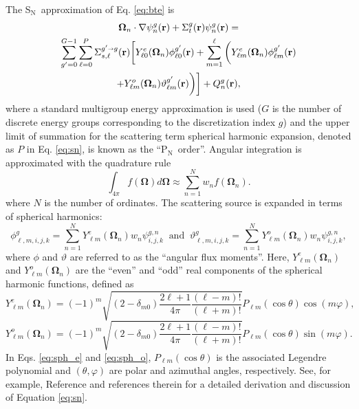 \documentclass{article} %
\newcommand{\sa}{\shortrightarrow}
\newcommand{\bo}{\mathbf\Omega}
\newcommand{\vecr}{\textbf{r}}
\newcommand{\sn}{S$_\mathrm{N}$}
\newcommand{\pn}{P$_\mathrm{N}$}
\newcommand{\Ye}[2]{\ensuremath{Y^e_{#1}(\bo_#2)}}
\newcommand{\Yo}[2]{\ensuremath{Y^o_{#1}(\bo_#2)}}
\begin{document}
The \sn\ approximation of Eq. \eqref{eq:bte} is
%
\begin{multline}
\bo_n \cdot \nabla \psi_n^g(\vecr) + \Sigma_t^g(\vecr)\psi_n^g(\vecr) = \\
\sum_{g'=0}^{G-1}\sum_{\ell=0}^{P}\Sigma_{s,\ell}^{g'\sa g}(\vecr)
\bigg[\Ye{\ell 0}{n}\phi_{\ell 0}^{g'}(\vecr) + \sum_{m=1}^{\ell}
\bigg(\Ye{\ell m}{n}\phi_{\ell m}^{g'}(\vecr) \\
 + \Yo{\ell m}{n}\vartheta_{\ell m}^{g'}(\vecr)\bigg)\bigg]
+ Q_n^g(\vecr),
\label{eq:sn}
\end{multline}
%
where a standard multigroup energy approximation is used ($G$ is the
number of discrete energy groups corresponding to the discretization index
$g$) and the  upper limit of summation for the scattering term spherical
harmonic expansion, denoted as $P$ in Eq. \eqref{eq:sn}, is known as the
``\pn\ order''. Angular integration is approximated with the quadrature rule 
%
\begin{equation}
\int_{4\pi} f\left(\bo\right) d\bo \approx \sum_{n=1}^{N}w_n f\left(\bo_n\right).
\label{eq:quadrule}
\end{equation}
%
where $N$ is the number of ordinates. The scattering source is expanded in terms
of spherical harmonics:
%
\begin{equation}
\phi_{\ell,m,i,j,k}^{g}=\sum_{n=1}^N \Ye{\ell m}{n}w_n\psi^{g,n}_{i,j,k}\ \text{ and }\
\vartheta_{\ell,m,i,j,k}^{g} = \sum_{n=1}^N \Yo{\ell m}{n}w_n\psi^{g,n}_{i,j,k},
\label{sph_harm_exp}
\end{equation}
%
where $\phi$ and $\vartheta$ are referred to as the ``angular flux
moments''. Here, $\Ye{\ell m}{n}$ and $\Yo{\ell m}{n}$ are the ``even'' and
``odd'' real components of the spherical harmonic functions, defined as
\cite{exmm}
%
\begin{equation}
\Ye{\ell m}{n} = (-1)^m\sqrt{(2-\delta_{m0})\frac{2\ell+1}{4\pi}
                       \frac{(\ell-m)!}{(\ell+m)!}}
                       P_{\ell m}(\cos\theta)\cos(m\varphi),
\label{eq:sph_e}
\end{equation}
\begin{equation}
\Yo{\ell m}{n} = (-1)^m\sqrt{(2-\delta_{m0})\frac{2\ell+1}{4\pi}
                       \frac{(\ell-m)!}{(\ell+m)!}}
                       P_{\ell m}(\cos\theta)\sin(m\varphi).
\label{eq:sph_o}
\end{equation}
%
In Eqs. \eqref{eq:sph_e} and \eqref{eq:sph_o},
$P_{\ell m}(\cos\theta)$ is the associated Legendre polynomial and
$(\theta,\varphi)$ are polar and azimuthal angles, respectively. 
See, for example, Reference \cite{denovo} and references therein for a
detailed derivation  and discussion of Equation \eqref{eq:sn}.
\end{document}
